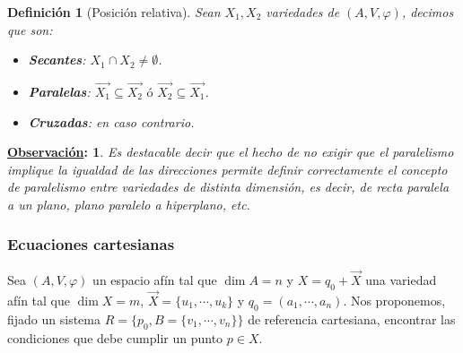 \documentclass[10pt,a4paper,openright]{book}
\theoremstyle{break}
\newtheorem*{defi}{Definición}
\newtheorem*{obs}{\underline{Observación}:}
\begin{document}
\begin{defi}[Posición relativa]
Sean $X_1, X_2$ variedades de $(A,V,\varphi)$, decimos que son:
\begin{itemize}
\item \textbf{Secantes}: $X_1 \cap X_2 \neq\emptyset $.
\item \textbf{Paralelas}: $\vec{X_1} \subseteq \vec{X_2} \mbox{ ó } \vec{X_2} \subseteq \vec{X_1}$.
\item  \textbf{Cruzadas}: en caso contrario.
\end{itemize}
\end{defi}

\begin{obs}
Es destacable decir que el hecho de no exigir que el paralelismo implique la igualdad de las direcciones permite definir correctamente el concepto de paralelismo entre variedades de distinta dimensión, es decir, de recta paralela a un plano, plano paralelo a hiperplano, etc.
\end{obs}

\subsubsection{Ecuaciones cartesianas}
Sea $(A,V,\varphi)$ un espacio afín tal que $\dim A = n$ y $X= q_0 + \vec{X}$ una variedad afín tal que $\dim X =m$, $\vec{X} = \{u_1, \cdots, u_k\}$ y $q_0 = (a_1, \cdots, a_n)$. Nos proponemos, fijado un sistema $R= \{p_0, B=\{v_1, \cdots, v_n\}\}$ de referencia cartesiana, encontrar las condiciones que debe cumplir un punto $p\in X$.
\end{document}
